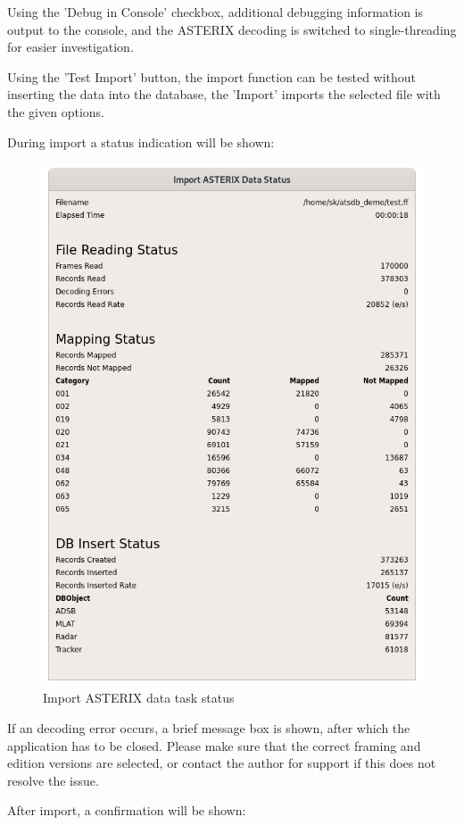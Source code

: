 Using the 'Debug in Console' checkbox, additional debugging information is output to the console, and the ASTERIX decoding is switched to single-threading for easier investigation.

Using the 'Test Import' button, the import function can be tested without inserting the data into the database, the 'Import' imports the selected file with the given options.

During import a status indication will be shown:

\begin{figure}[H]
  \center
    \includegraphics[width=12cm]{../screenshots/asterix_import_status.png}
  \caption{Import ASTERIX data task status}
\end{figure}

If an decoding error occurs, a brief message box is shown, after which the application has to be closed. Please make sure that the correct framing and edition versions are selected, or contact the author for support if this does not resolve the issue.

After import, a confirmation will be shown:

